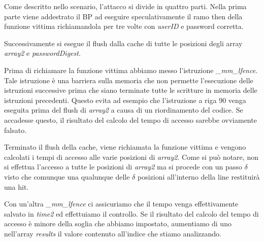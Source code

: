 				Come descritto nello scenario, l'attacco si divide in quattro parti. Nella prima parte viene addestrato il \ac{BP} ad eseguire speculativamente il ramo then della funzione vittima richiamandola per tre volte con \emph{userID} e password corretta.
				
				Successivamente si esegue il flush dalla cache di tutte le posizioni degli array \emph{array2} e \emph{passwordDigest}.
				
				Prima di richiamare la funzione vittima abbiamo messo l'istruzione \emph{\_mm\_lfence}. Tale istruzione è una barriera sulla memoria che non permette l'esecuzione delle istruzioni successive prima che siano terminate tutte le scritture in memoria delle istruzioni precedenti. Questo evita ad esempio che l'istruzione a riga 90 venga eseguita prima del flush di \emph{array2} a causa di un riordinamento del codice. Se accadesse questo, il risultato del calcolo del tempo di accesso sarebbe ovviamente falsato.
				
				Terminato il flush della cache, viene richiamata la funzione vittima e vengono calcolati i tempi di accesso alle varie posizioni di \emph{array2}. Come si può notare, non si effettua l'accesso a tutte le posizioni di \emph{array2} ma si procede con un passo $\delta$ visto che comunque una qualunque delle $\delta$ posizioni all'interno della line restituirà una hit.
				
				Con un'altra \emph{\_mm\_lfence} ci assicuriamo che il tempo venga effettivamente salvato in \emph{time2} ed effettuiamo il controllo. Se il risultato del calcolo del tempo di accesso è minore della soglia che abbiamo impostato, aumentiamo di uno nell'array \emph{results} il valore  contenuto all'indice che stiamo analizzando.